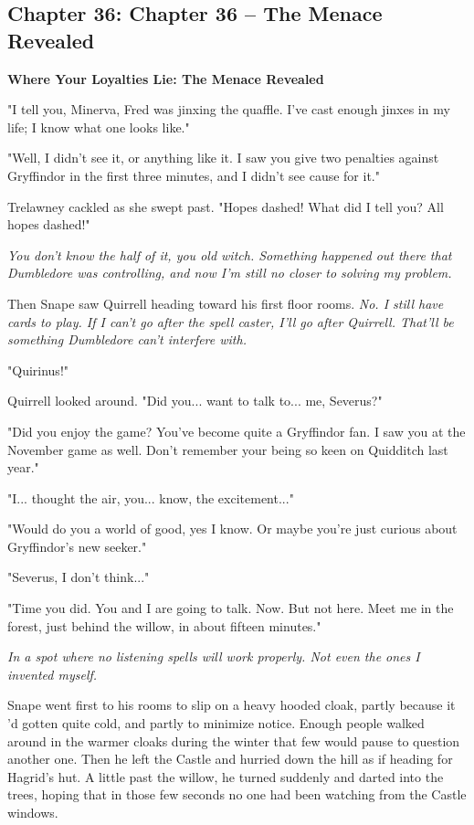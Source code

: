 \documentclass[a4paper,11pt]{article}
\begin{document}
\subsection{Chapter 36: Chapter 36 – The Menace Revealed}

\textbf{Where Your Loyalties Lie: The Menace Revealed}

"I tell you, Minerva, Fred was jinxing the quaffle. I've cast enough jinxes in my life; I know what one looks like."

"Well, I didn't see it, or anything like it. I saw you give two penalties against Gryffindor in the first three minutes, and I didn't see cause for it."

Trelawney cackled as she swept past. "Hopes dashed! What did I tell you? All hopes dashed!"

\emph{You don't know the half of it, you old witch. Something happened out there that Dumbledore was controlling, and now I'm still no closer to solving my problem.}

Then Snape saw Quirrell heading toward his first floor rooms. \emph{No. I still have cards to play. If I can't go after the spell caster, I'll go after Quirrell. That'll be something Dumbledore can't interfere with.}

"Quirinus!"

Quirrell looked around. "Did you... want to talk to... me, Severus?"

"Did you enjoy the game? You've become quite a Gryffindor fan. I saw you at the November game as well. Don't remember your being so keen on Quidditch last year."

"I... thought the air, you... know, the excitement..."

"Would do you a world of good, yes I know. Or maybe you're just curious about Gryffindor's new seeker."

"Severus, I don't think..."

"Time you did. You and I are going to talk. Now. But not here. Meet me in the forest, just behind the willow, in about fifteen minutes."

\emph{In a spot where no listening spells will work properly. Not even the ones I invented myself.}

Snape went first to his rooms to slip on a heavy hooded cloak, partly because it 'd gotten quite cold, and partly to minimize notice. Enough people walked around in the warmer cloaks during the winter that few would pause to question another one. Then he left the Castle and hurried down the hill as if heading for Hagrid's hut. A little past the willow, he turned suddenly and darted into the trees, hoping that in those few seconds no one had been watching from the Castle windows.
\end{document}
